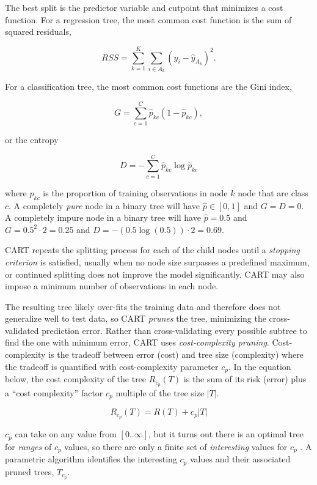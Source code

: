 \documentclass[
]{book}
\begin{document}
The best split is the predictor variable and cutpoint that minimizes a cost function. For a regression tree, the most common cost function is the sum of squared residuals,

\[RSS = \sum_{k=1}^K\sum_{i \in A_k}{\left(y_i - \hat{y}_{A_k} \right)^2}.\]

For a classification tree, the most common cost functions are the Gini index,

\[G = \sum_{c=1}^C{\hat{p}_{kc}(1 - \hat{p}_{kc})},\]

or the entropy

\[D = - \sum_{c=1}^C{\hat{p}_{kc} \log \hat{p}_{kc}}\]

where \(\hat{p}_{kc}\) is the proportion of training observations in node \(k\) node that are class \(c\). A completely \emph{pure} node in a binary tree will have \(\hat{p} \in [0, 1]\) and \(G = D = 0\). A completely impure node in a binary tree will have \(\hat{p} = 0.5\) and \(G = 0.5^2 \cdot 2 = 0.25\) and \(D = -(0.5 \log(0.5)) \cdot 2 = 0.69\).

CART repeats the splitting process for each of the child nodes until a \emph{stopping criterion} is satisfied, usually when no node size surpasses a predefined maximum, or continued splitting does not improve the model significantly. CART may also impose a minimum number of observations in each node.

The resulting tree likely over-fits the training data and therefore does not generalize well to test data, so CART \emph{prunes} the tree, minimizing the cross-validated prediction error. Rather than cross-validating every possible subtree to find the one with minimum error, CART uses \emph{cost-complexity pruning}. Cost-complexity is the tradeoff between error (cost) and tree size (complexity) where the tradeoff is quantified with cost-complexity parameter \(c_p\). In the equation below, the cost complexity of the tree \(R_{c_p}(T)\) is the sum of its risk (error) plus a ``cost complexity'' factor \(c_p\) multiple of the tree size \(|T|\).

\[R_{c_p}(T) = R(T) + c_p|T|\]

\(c_p\) can take on any value from \([0..\infty]\), but it turns out there is an optimal tree for \emph{ranges} of \(c_p\) values, so there are only a finite set of \emph{interesting} values for \(c_p\) \citep{James2013} \citep{Therneau2019} \citep{Kuhn2016}. A parametric algorithm identifies the interesting \(c_p\) values and their associated pruned trees, \(T_{c_p}\).
\end{document}
